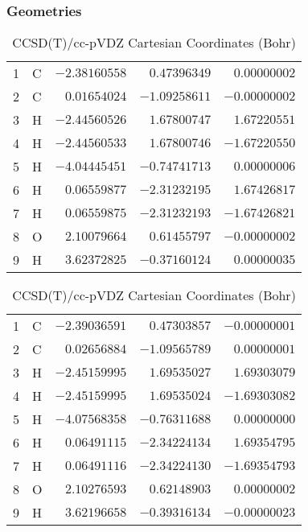 \documentclass[10pt,oneside]{article}
\begin{document}
\begin{table}[h!]
\subsubsection*{Geometries}
\begin{multicols}{2}
\centering
\caption{CCSD(T)/cc-pVTZ Cartesian Coordinates (Bohr)}
\begin{tabular}{llrrr}
\toprule
1  & C  & $-2.38160558$ & $ 0.47396349$ & $ 0.00000002$ \\
2  & C  & $ 0.01654024$ & $-1.09258611$ & $-0.00000002$ \\
3  & H  & $-2.44560526$ & $ 1.67800747$ & $ 1.67220551$ \\
4  & H  & $-2.44560533$ & $ 1.67800746$ & $-1.67220550$ \\
5  & H  & $-4.04445451$ & $-0.74741713$ & $ 0.00000006$ \\
6  & H  & $ 0.06559877$ & $-2.31232195$ & $ 1.67426817$ \\
7  & H  & $ 0.06559875$ & $-2.31232193$ & $-1.67426821$ \\
8  & O  & $ 2.10079664$ & $ 0.61455797$ & $-0.00000002$ \\
9  & H  & $ 3.62372825$ & $-0.37160124$ & $ 0.00000035$ \\
\bottomrule
\end{tabular}
\caption{CCSD(T)/cc-pVDZ Cartesian Coordinates (Bohr)}
\begin{tabular}{llrrr}
\toprule
1  & C  & $-2.39036591$ & $ 0.47303857$ & $-0.00000001$ \\
2  & C  & $ 0.02656884$ & $-1.09565789$ & $ 0.00000001$ \\
3  & H  & $-2.45159995$ & $ 1.69535027$ & $ 1.69303079$ \\
4  & H  & $-2.45159995$ & $ 1.69535024$ & $-1.69303082$ \\
5  & H  & $-4.07568358$ & $-0.76311688$ & $ 0.00000000$ \\
6  & H  & $ 0.06491115$ & $-2.34224134$ & $ 1.69354795$ \\
7  & H  & $ 0.06491116$ & $-2.34224130$ & $-1.69354793$ \\
8  & O  & $ 2.10276593$ & $ 0.62148903$ & $ 0.00000002$ \\
9  & H  & $ 3.62196658$ & $-0.39316134$ & $-0.00000023$ \\
\bottomrule
\end{tabular}
\end{multicols}
\end{table}
\end{document}
